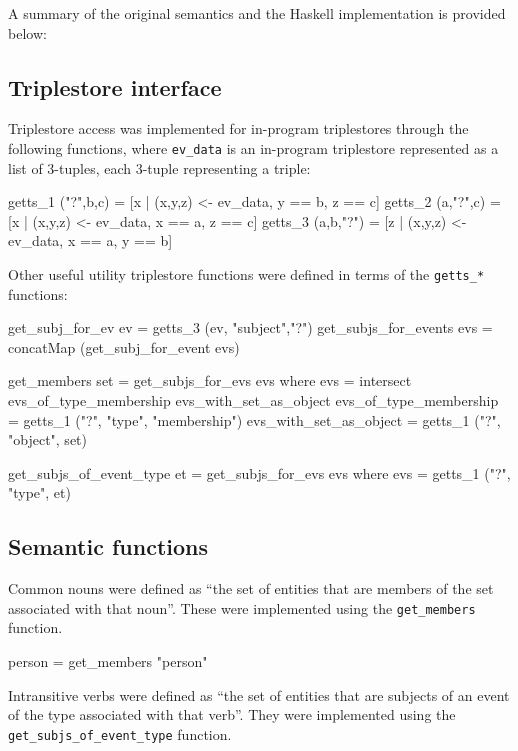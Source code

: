 \documentclass[../main.tex]{subfiles}
\begin{document}
A summary of the original semantics and the Haskell implementation is provided below:

\subsection{Triplestore interface}

Triplestore access was implemented for in-program triplestores through the following functions, where
\texttt{ev\_data} is an in-program triplestore represented as a list of 3-tuples, each 3-tuple representing a triple:

\begin{code}
  getts_1 ("?",b,c)   = [x | (x,y,z) <- ev_data, y == b, z == c]
  getts_2 (a,"?",c)   = [x | (x,y,z) <- ev_data, x == a, z == c]
  getts_3 (a,b,"?")   = [z | (x,y,z) <- ev_data, x == a, y == b]
\end{code}

Other useful utility triplestore functions were defined in terms of the \texttt{getts\_*}
functions:

\begin{code}
  get_subj_for_ev ev       = getts_3 (ev,  "subject","?")
  get_subjs_for_events evs = concatMap (get_subj_for_event evs)
	
  get_members set = get_subjs_for_evs evs
  where
    evs = intersect evs_of_type_membership evs_with_set_as_object
    evs_of_type_membership   = getts_1 ("?", "type", "membership")
    evs_with_set_as_object   = getts_1 ("?",  "object",  set)
		
  get_subjs_of_event_type et  = get_subjs_for_evs evs
  where
    evs = getts_1 ("?",  "type",  et)
\end{code}

\subsection{Semantic functions}

Common nouns were defined as ``the set of entities that are members of the set associated with that noun''\cite{frost2014denotational}.
These were implemented using the \texttt{get\_members} function.

\begin{code}
	person = get_members "person"
\end{code}

Intransitive verbs were defined as ``the set of entities that are subjects of an event of the type associated with that verb''\cite{frost2014denotational}.
They were implemented using the \texttt{get\_subjs\_of\_event\_type} function.
\end{document}
